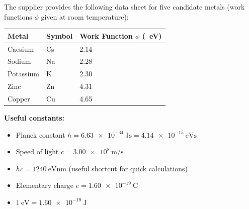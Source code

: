 \documentclass[11pt]{article}
\begin{document}
The supplier provides the following data sheet for five candidate metals (work functions $\phi$ given at room temperature):

\begin{center}
\begin{tabularx}{\linewidth}{|l|X|X|}\hline
\rowcolor{popblueL}
\textbf{Metal} & \textbf{Symbol} & \textbf{Work Function $\phi$ (\SI{}{\electronvolt})} \\ \hline
Caesium & Cs & 2.14 \\ \hline
Sodium & Na & 2.28 \\ \hline
Potassium & K & 2.30 \\ \hline
Zinc & Zn & 4.31 \\ \hline
Copper & Cu & 4.65 \\ \hline
\end{tabularx}
\end{center}

\textbf{Useful constants:}
\begin{itemize}
    \item Planck constant $h = \SI{6.63e-34}{\joule\second} = \SI{4.14e-15}{\electronvolt\second}$
    \item Speed of light $c = \SI{3.00e8}{\meter\per\second}$
    \item $hc = \SI{1240}{\electronvolt\nano\meter}$ (useful shortcut for quick calculations)
    \item Elementary charge $e = \SI{1.60e-19}{\coulomb}$
    \item $1\ \mathrm{eV} = \SI{1.60e-19}{\joule}$
\end{itemize}
\end{document}
